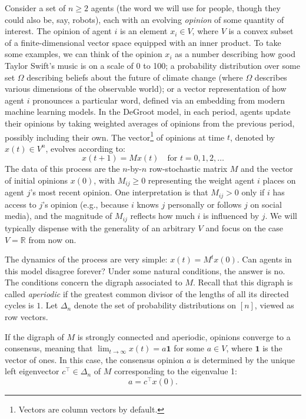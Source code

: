 \documentclass{notices}
\theoremstyle{definition}\newtheorem{problem}{Problem}
\begin{document}
Consider a set of $n \geq 2$ agents (the word we will use for people, though they could also be, say, robots), each with an evolving \emph{opinion} of some quantity of interest. The opinion of agent $i$ is an element $x_i \in V$, where $V$ is a convex subset of a finite-dimensional vector space equipped with an inner product. To take some examples, we can think of the opinion $x_i$ as a number describing how good Taylor Swift's music is on a scale of 0 to 100; a probability distribution over some set $\Omega$ describing beliefs about the future of climate change (where $\Omega$ describes various dimensions of the observable world);  or a vector representation of how agent $i$ pronounces a particular word, defined via an embedding from modern machine learning models. In the DeGroot model, in each period, agents update their opinions by taking weighted averages of opinions from the previous period, possibly including their own. The vector\footnote{Vectors are column vectors by default.} of opinions at time $t$, denoted by $x(t) \in V^n$, evolves according to:
$$ x(t+1) = Mx(t) \quad \text{for $t=0,1,2,\ldots$}$$ The data of this process are the $n$-by-$n$ row-stochastic matrix $M$ and the vector of initial opinions $x(0)$, with $M_{ij} \geq 0$ representing the weight agent $i$ places on agent $j$'s most recent opinion. One interpretation is that \(M_{ij} > 0\) only if \(i\) has access to \(j\)'s opinion (e.g., because \(i\) knows \(j\) personally or follows \(j\) on social media), and the magnitude of \(M_{ij}\) reflects how much \(i\) is influenced by \(j\).  We will typically dispense with the generality of an arbitrary $V$ and focus on the case $V=\mathbb{R}$ from now on.



The dynamics of the process are very simple: $x(t) = M^t x(0)$. Can agents in this model disagree forever? Under some natural conditions, the answer is no. The conditions concern the digraph associated to $M$. Recall that this digraph is called \emph{aperiodic} if the greatest common divisor of the lengths of all its directed cycles is $1$. Let $\Delta_n$ denote the set of probability distributions on $[n]$, viewed as row vectors.

\begin{fact} \label{fact:degroot_convergence} If the digraph of $M$ is strongly connected and aperiodic, opinions converge to a consensus, meaning that $\lim_{t \to \infty} x(t) = a \mathbf{1}$ for some $a \in V$, where $\mathbf{1}$ is the vector of ones. In this case, the consensus opinion $a$ is determined by the unique left eigenvector $c^\top \in \Delta_n$ of $M$  corresponding to the eigenvalue 1:
$$ a = c^\top x(0). $$
\end{fact}
\end{document}

